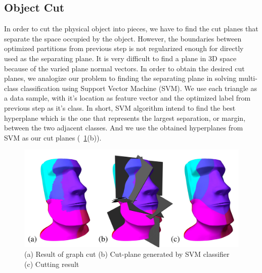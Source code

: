 \subsection{Object Cut}
In order to cut the physical object into pieces, we have to find the cut planes that separate the space occupied by the object.
However, the boundaries between optimized partitions from previous step is not regularized enough for directly used as the separating plane. 
It is very difficult to find a plane in 3{D} space because of the varied plane normal vectors.
In order to obtain the desired cut planes, we analogize our problem to finding the separating plane in solving multi-class classification using Support Vector Machine (SVM).
We use each triangle as a data sample, with it's location as feature vector and the optimized label from previous step as it's class.
In short, SVM algorithm intend to find the best hyperplane which is the one that represents the largest separation, or margin, between the two adjacent classes. 
And we use the obtained hyperplanes from SVM as our cut planes (\figname~\ref{fig:cut_plane}(b)).


\begin{figure}[ht]
\centering
\includegraphics[width=1.0\linewidth]{figs/cut_plane1.pdf} 
\caption{(a) Result of graph cut (b) Cut-plane generated by SVM classifier (c) Cutting result} 
\label{fig:cut_plane}
\end{figure}

